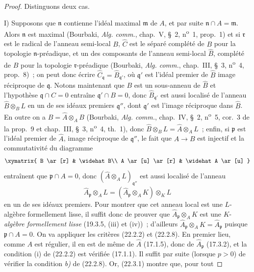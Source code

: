 \begin{proof}
Distinguons deux cas.

I) Supposons que $\mathfrak n$ contienne l'idéal maximal $\mathfrak m$ de
$A$, et par suite $\mathfrak n\cap A=\mathfrak m$. Alors $\mathfrak n$ est
maximal (Bourbaki, \emph{Alg. comm.}, chap.~V, §~2,
n\textsuperscript{o}~1, prop.~1) et si $\mathfrak r$ est le radical de
l'anneau semi-local $B$, $\widehat C$ est le séparé complété de $B$ pour la
topologie $\mathfrak n$-préadique, et un des composants de l'anneau
semi-local $\widehat B$, complété de $B$ pour la topologie
$\mathfrak r$-préadique (Bourbaki, \emph{Alg. comm.}, chap.~III, §~3,
n\textsuperscript{o}~4, prop.~8)~; on peut donc écrire
$\widehat C_\mathfrak q=\widehat B_{\mathfrak q'}$, où $\mathfrak q'$ est
l'idéal premier de $\widehat B$ image réciproque de $\mathfrak q$. Notons
maintenant que $B$ est un sous-anneau de $\widehat B$ et l'hypothèse
$\mathfrak q\cap C=0$ entraîne $\mathfrak q'\cap B=0$, donc
$\widehat B_{\mathfrak q'}$ est aussi localisé de l'anneau
$\widehat B\otimes_B L$ en un de ses idéaux premiers $\mathfrak q''$, dont
$\mathfrak q'$ est l'image réciproque dans $\widehat B$. En outre on a
$\widehat B=\widehat A\otimes_A B$ (Bourbaki, \emph{Alg. comm.}, chap.~IV,
§~2, n\textsuperscript{o}~5, cor.~3 de la prop.~9 et chap.~III, §~3,
n\textsuperscript{o}~4, th.~1), donc
$\widehat B\otimes_B L=\widehat A\otimes_A L$~; enfin, si $\mathfrak p$ est
l'idéal premier de $\widehat A$, image réciproque de $\mathfrak q''$, le
fait que $A\to B$ est injectif et la commutativité du diagramme
\[
  \xymatrix{
    B \ar[r] & \widehat B\\
    A \ar[u] \ar[r] & \widehat A \ar[u]
  }
\]
entraînent que $\mathfrak p\cap A=0$, donc
$(\widehat A\otimes_A L)_{\mathfrak q''}$ est aussi localisé de l'anneau
\[
  \widehat A_\mathfrak p\otimes_A L
  =(\widehat A_\mathfrak p\otimes_A K)\otimes_K L
\]
en un de ses idéaux premiers. Pour montrer que cet anneau local est une $L$-algèbre formellement lisse,
il suffit donc de prouver que $\widehat A_\mathfrak p\otimes_A K$ est une
$K$-\emph{algèbre formellement lisse} (19.3.5, (iii) et (iv))~; d'ailleurs
$\widehat A_\mathfrak p\otimes_A K=\widehat A_\mathfrak p$ puisque
$\mathfrak p\cap A=0$. On va appliquer les critères (22.2.2) et (22.2.8).
En premier lieu, comme $A$ est régulier, il en est de même de $\widehat A$
(17.1.5), donc de $\widehat A_\mathfrak p$ (17.3.2), et la condition (i) de
(22.2.2) est vérifiée (17.1.1). Il suffit par suite (lorsque $p>0$) de
vérifier la condition \emph{b)} de (22.2.8). Or, (22.3.1) montre que, pour tout

\end{proof}
